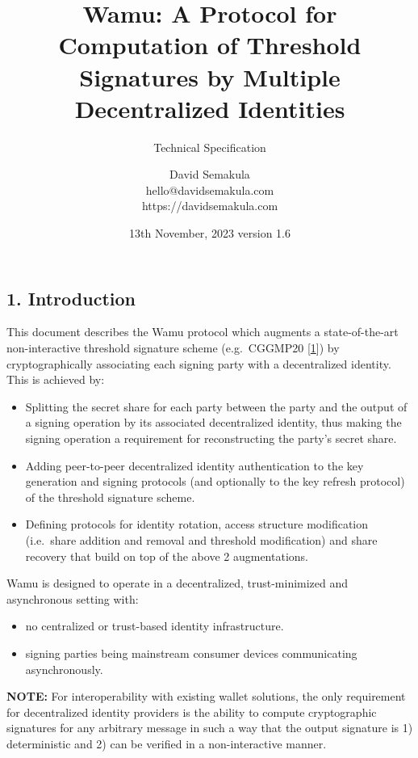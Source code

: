 \documentclass[
]{article}
\title{Wamu: A Protocol for Computation of Threshold Signatures by
Multiple Decentralized Identities}
\subtitle{Technical Specification}
\author{David Semakula\\
hello@davidsemakula.com\\
https://davidsemakula.com}
\date{13th November, 2023 \textbar{} version 1.6}
\providecommand{\tightlist}{%
  \setlength{\itemsep}{0pt}\setlength{\parskip}{0pt}}
\begin{document}
\maketitle

{
\setcounter{tocdepth}{3}
\tableofcontents
}
\hypertarget{introduction}{%
\subsection{1. Introduction}\label{introduction}}

This document describes the Wamu protocol which augments a
state-of-the-art non-interactive threshold signature scheme
(e.g.~CGGMP20 {[}\protect\hyperlink{ref-cggmp20}{1}{]}) by
cryptographically associating each signing party with a decentralized
identity. This is achieved by:

\begin{itemize}
\tightlist
\item
  Splitting the secret share for each party between the party and the
  output of a signing operation by its associated decentralized
  identity, thus making the signing operation a requirement for
  reconstructing the party's secret share.
\item
  Adding peer-to-peer decentralized identity authentication to the key
  generation and signing protocols (and optionally to the key refresh
  protocol) of the threshold signature scheme.
\item
  Defining protocols for identity rotation, access structure
  modification (i.e.~share addition and removal and threshold
  modification) and share recovery that build on top of the above 2
  augmentations.
\end{itemize}

Wamu is designed to operate in a decentralized, trust-minimized and
asynchronous setting with:

\begin{itemize}
\tightlist
\item
  no centralized or trust-based identity infrastructure.
\item
  signing parties being mainstream consumer devices communicating
  asynchronously.
\end{itemize}

\textbf{NOTE:} For interoperability with existing wallet solutions, the
only requirement for decentralized identity providers is the ability to
compute cryptographic signatures for any arbitrary message in such a way
that the output signature is 1) deterministic and 2) can be verified in
a non-interactive manner.
\end{document}
